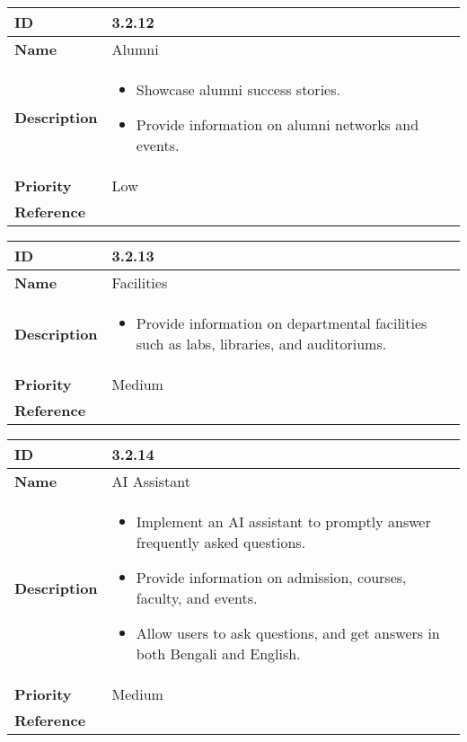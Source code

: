 \begin{center}
\begin{tabular}{ | >{\bfseries}m{5em} | m{10cm} |  } 
  \hline
  ID & 3.2.12\\  
  \hline
  Name & Alumni \\  
  \hline
  Description & 
  \begin{itemize}
      \item Showcase alumni success stories.
      \item Provide information on alumni networks and events.
  \end{itemize} \\ 
  \hline
  Priority & Low\\
  \hline 
  Reference & \\
  \hline
\end{tabular}
\end{center}

\vspace{0.5cm}

\begin{center}
\begin{tabular}{ | >{\bfseries}m{5em} | m{10cm} |  } 
  \hline
  ID & 3.2.13\\  
  \hline
  Name & Facilities \\  
  \hline
  Description & 
  \begin{itemize}
      \item Provide information on departmental facilities such as labs, libraries, and auditoriums.
  \end{itemize} \\ 
  \hline
  Priority & Medium\\
  \hline 
  Reference & \\
  \hline
\end{tabular}
\end{center}

\vspace{0.5cm}

\begin{center}
\begin{tabular}{ | >{\bfseries}m{5em} | m{10cm} |  } 
  \hline
  ID & 3.2.14\\  
  \hline
  Name & AI Assistant \\  
  \hline
  Description & 
  \begin{itemize}
      \item Implement an AI assistant to promptly answer frequently asked questions.
      \item Provide information on admission, courses, faculty, and events.
      \item Allow users to ask questions, and get answers in both Bengali and English.
  \end{itemize} \\ 
  \hline
  Priority & Medium\\
  \hline 
  Reference & \\
  \hline
  
\end{tabular}
\end{center}
